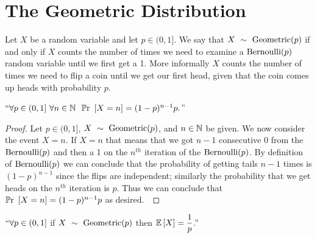     \section{The Geometric Distribution}
        \begin{definition}
            Let $X$ be a random variable and let $p \in (0, 1]$. We say that $X~\sim~\mathrm{Geometric}(p)$
            if and only if $X$ counts the number of times we need to examine a $\mathrm{Bernoulli}(p)$ random
            variable until we first get a 1. More informally $X$ counts the number of times we need
            to flip a coin until we get our first head, given that the coin comes up heads with
            probability $p$.
        \end{definition}
        \begin{theorem}
            $``\forall p \in (0, 1] \ \forall n \in \mathbb{N} \ \ \mathbb{P}\mathrm{r}~\left[X = n\right] = (1 - p)^{n - 1}p.$''
            \label{geopmf}
        \end{theorem}
        \begin{proof}
            Let $p \in (0, 1]$, $X~\sim~\mathrm{Geometric}(p)$, and $n \in \mathbb{N}$  be given. 
            We now consider the event $X = n$. If $X = n$ that means that we got $n - 1$
            consecutive 0 from the $\mathrm{Bernoulli}(p)$ and then a 1 on the $n^{th}$ iteration
            of the $\mathrm{Bernoulli}(p)$. By definition of $\mathrm{Bernoulli}(p)$ we can conclude that 
            the probability of getting tails $n - 1$ times is $(1 - p)^{n - 1}$ since
            the flips are independent; similarly the probability that we get heads on
            the $n^{th}$ iteration is $p$. Thus we can conclude that $\mathbb{P}\mathrm{r}~\left[X = n\right] = (1 - p)^{n - 1}p$
            as desired.~\QED
        \end{proof}
        \begin{theorem}
            $``\forall p \in (0, 1]$ if $X~\sim~\mathrm{Geometric}(p)$ then $\mathbb{E}\left[X\right] = \dfrac{1}{p}$.''
        \end{theorem}

